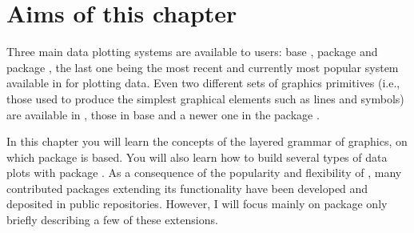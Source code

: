 \documentclass[krantz2]{krantz}\usepackage{knitr}
\begin{document}


\section{Aims of this chapter}

Three main data plotting systems are available to \Rlang users: base \Rlang, package  \autocite{Sarkar2008} and package  \autocite{Wickham2016}, the last one being the most recent and currently most popular system available in \Rlang for plotting data. Even two different sets of graphics primitives (i.e., those used to produce the simplest graphical elements such as lines and symbols) are available in \Rlang, those in base \Rlang and a newer one in the  package \autocite{Murrell2011}.

In this chapter you will learn the concepts of the layered grammar of graphics, on which package  is based. You will also learn how to build several types of data plots with package . As a consequence of the popularity and flexibility of , many contributed packages extending its functionality have been developed and deposited in public repositories. However, I will focus mainly on package  only briefly describing a few of these extensions.
\end{document}
